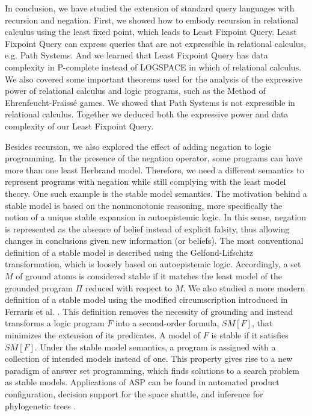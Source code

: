 In conclusion, we have studied the extension of standard query languages with recursion and negation. First, we showed how to embody recursion in relational calculus using the least fixed point, which leads to Least Fixpoint Query. Least Fixpoint Query can express queries that are not expressible in relational calculus, e.g.  Path Systems. And we learned that Least Fixpoint Query has data complexity in P-complete instead of LOGSPACE in which of relational calculus. We also covered some important theorems used for the analysis of the expressive power of relational calculus and logic programs, such as the Method of Ehrenfeucht-Fra\"ıss\'e games. We showed that Path Systems is not expressible in relational calculus. Together we deduced both the expressive power and data complexity of our Least Fixpoint Query. 

Besides recursion, we also explored the effect of adding negation 
to logic programming. In the presence of the negation operator, 
some programs can have more than one least Herbrand model. Therefore, 
we need a different semantics to represent programs with negation 
while still complying with the least model theory. One such 
example is the stable model semantics. The motivation behind 
a stable model is based on the nonmonotonic reasoning, more 
specifically the notion of a unique stable expansion in 
autoepistemic logic. In this sense, negation is represented as 
the absence of belief instead of explicit falsity, thus allowing 
changes in conclusions given new information (or beliefs). The 
most conventional definition of a stable model is described 
using the Gelfond-Lifschitz transformation, which is loosely based on 
autoepistemic logic. Accordingly, a set $M$ of ground atoms is considered 
stable if it matches the least model of the grounded program $\Pi$ reduced 
with respect to $M$. We also studied a more modern definition of a stable 
model using the modified circumscription introduced in Ferraris et al. \cite{lee}. 
This definition removes the necessity of grounding and instead transforms 
a logic program $F$ into a second-order formula, $SM[F]$, that minimizes the extension of 
its predicates. A model of $F$ is stable if it satisfies $SM[F]$. 
Under the stable model semantics, a program is assigned with a 
collection of intended models instead of one. This property 
gives rise to a new paradigm of answer set programming, 
which finds solutions to a search problem as stable models. Applications 
of ASP can be found in automated product configuration, decision 
support for the space shuttle, and inference for phylogenetic trees \cite{lifschitz0}.

